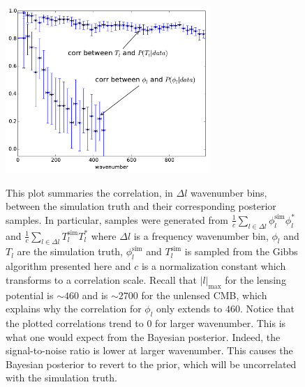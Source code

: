 \documentclass[iop,revtex4,apj,onecolumn]{emulateapj}
\begin{document}
\begin{figure}
\begin{center}
{\includegraphics[height=2.5in]{figure9a.pdf}}%
\end{center}
\caption{\label{t spec fig}
This plot summaries the correlation, in $\Delta l$ wavenumber bins, between the simulation truth and their corresponding posterior samples. In particular,
samples were generated from $\frac{1}{c}\sum_{l\in \Delta l} \phi^\text{sim}_l\phi^*_l $ and $\frac{1}{c}\sum_{l\in \Delta l} T^\text{sim}_lT^*_l $ where $\Delta l$ is a frequency wavenumber bin,  $\phi_l$ and $T_l$ are the simulation truth, $\phi^\text{sim}_l$  and $T^\text{sim}_l$  is sampled from the Gibbs algorithm presented here and $c$ is a normalization constant which transforms to a correlation scale.  Recall that $|l|_\text{max}$ for the lensing potential is $\sim460$ and is $\sim2700$ for the unlensed CMB, which explains why the correlation for $\phi_l$ only extends to $460$.
Notice that the plotted correlations trend to $0$ for larger wavenumber.
This is what one would expect from the Bayesian posterior. Indeed, the signal-to-noise ratio is lower at larger wavenumber. This causes the Bayesian posterior to revert to the prior, which will be uncorrelated with the simulation truth. 
}
\end{figure}
\end{document}
